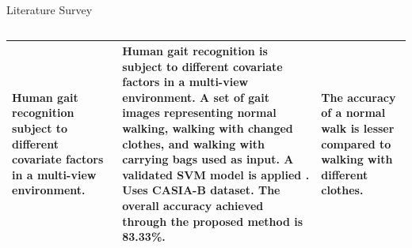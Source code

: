 \documentclass[xcolor=dvipsnames]{beamer}
\begin{document}
\begin{frame}{Literature Survey}
\begin{table}
\begin{tabular}{|p{3cm}|p{5cm}|p{3cm}|}
  \end{tabular}

  \begin{tabular}{|p{3cm}|p{5cm}|p{3cm}|}
    Human gait recognition subject to different covariate factors in a multi-view environment\cite{asif2022}.&
    Human gait recognition is subject to different covariate factors in a multi-view environment. A set of gait images representing normal walking, walking with changed clothes, and walking with carrying bags used as input. A validated SVM model is applied . Uses CASIA-B dataset. The overall accuracy achieved through the proposed method is 83.33\%.&
    The accuracy of a normal walk is lesser compared to walking with different clothes.\\
    \hline
  \end{tabular}
  
\end{table}
\end{frame}
\end{document}
